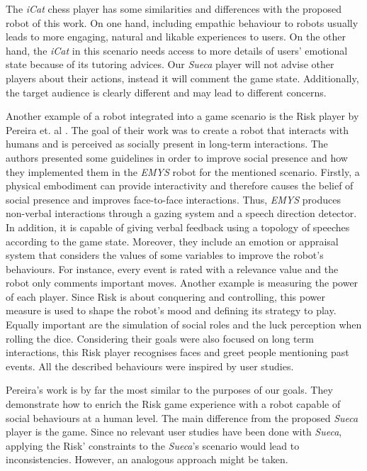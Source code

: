 The \emph{iCat} chess player has some similarities and differences with the proposed robot of this work.
On one hand, including empathic behaviour to robots usually leads to more engaging, natural and likable experiences to users.
On the other hand, the \emph{iCat} in this scenario needs access to more details of users' emotional state because of its tutoring advices. Our \emph{Sueca} player will not advise other players about their actions, instead it will comment the game state.
Additionally, the target audience is clearly different and may lead to different concerns.


Another example of a robot integrated into a game scenario is the Risk player by Pereira et. al \cite{Pereira}.
The goal of their work was to create a robot that interacts with humans and is perceived as socially present in long-term interactions.
The authors presented some guidelines in order to improve social presence and how they implemented them in the \emph{EMYS} robot for the mentioned scenario.
Firstly, a physical embodiment can provide interactivity and therefore causes the belief of social presence and improves face-to-face interactions.
Thus, \emph{EMYS} produces non-verbal interactions through a gazing system and a speech direction detector.
In addition, it is capable of giving verbal feedback using a topology of speeches according to the game state.
Moreover, they include an emotion or appraisal system that considers the values of some variables to improve the robot's behaviours.
For instance, every event is rated with a relevance value and the robot only comments important moves.
Another example is measuring the power of each player.
Since Risk is about conquering and controlling, this power measure is used to shape the robot's mood and defining its strategy to play.
Equally important are the simulation of social roles and the luck perception when rolling the dice.
Considering their goals were also focused on long term interactions, this Risk player recognises faces and greet people mentioning past events.
All the described behaviours were inspired by user studies.

Pereira's work is by far the most similar to the purposes of our goals.
They demonstrate how to enrich the Risk game experience with a robot capable of social behaviours at a human level.
The main difference from the proposed \emph{Sueca} player is the game.
Since no relevant user studies have been done with \emph{Sueca}, applying the Risk' constraints to the \emph{Sueca}'s scenario would lead to inconsistencies.
However, an analogous approach might be taken.

